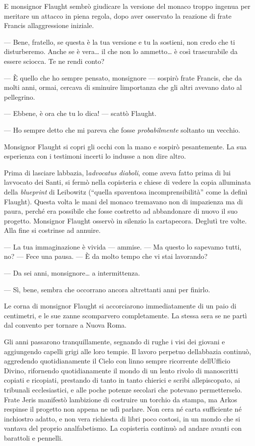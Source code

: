 E monsignor Flaught sembrò giudicare la versione del monaco troppo
ingenua per meritare un attacco in piena regola, dopo aver osservato la
reazione di frate Francis all\textquotesingle aggressione iniziale.

--- Bene, fratello, se questa è la tua versione e tu la sostieni, non
credo che ti disturberemo. Anche se è vera\ldots{} il che non lo
ammetto\ldots{} è così trascurabile da essere sciocca. Te ne rendi
conto?

--- È quello che ho sempre pensato, monsignore --- sospirò frate
Francis, che da molti anni, ormai, cercava di sminuire
l\textquotesingle importanza che gli altri avevano dato al pellegrino.

--- Ebbene, è ora che tu lo dica! --- scattò Flaught.

--- Ho sempre detto che mi pareva che fosse \emph{probabilmente}
soltanto un vecchio.

Monsignor Flaught si copri gli occhi con la mano e sospirò pesantemente.
La sua esperienza con i testimoni incerti lo indusse a non dire altro.

Prima di lasciare l\textquotesingle abbazia,
l\textquotesingle{}\emph{advocatus diaboli}, come aveva fatto prima di
lui l\textquotesingle avvocato dei Santi, si fermò nella copisteria e
chiese di vedere la copia alluminata della \emph{blueprint} di Leibowitz
(``quella spaventosa incomprensibilità'' come la definì Flaught). Questa
volta le mani del monaco tremavano non di impazienza ma di paura, perché
era possibile che fosse costretto ad abbandonare di nuovo il suo
progetto. Monsignor Flaught osservò in silenzio la cartapecora. Deglutì
tre volte. Alla fine si costrinse ad annuire.

--- La tua immaginazione è vivida --- ammise. --- Ma questo lo sapevamo
tutti, no? --- Fece una pausa. --- È da molto tempo che vi stai
lavorando?

--- Da sei anni, monsignore\ldots{} a intermittenza.

--- Sì, bene, sembra che occorrano ancora altrettanti anni per finirlo.

Le corna di monsignor Flaught si accorciarono immediatamente di un paio
di centimetri, e le sue zanne scomparvero completamente. La stessa sera
se ne partì dal convento per tornare a Nuova Roma.

Gli anni passarono tranquillamente, segnando di rughe i visi dei giovani
e aggiungendo capelli grigi alle loro tempie. Il lavoro perpetuo
dell\textquotesingle abbazia continuò, aggredendo quotidianamente il
Cielo con l\textquotesingle inno sempre ricorrente
dell\textquotesingle Ufficio Divino, rifornendo quotidianamente il mondo
di un lento rivolo di manoscritti copiati e ricopiati, prestando di
tanto in tanto chierici e scribi all\textquotesingle episcopato, ai
tribunali ecclesiastici, e alle poche potenze secolari che potevano
permetterselo. Frate Jeris manifestò l\textquotesingle ambizione di
costruire un torchio da stampa, ma Arkos respinse il progetto non appena
ne udì parlare. Non c\textquotesingle era né carta sufficiente né
inchiostro adatto, e non v\textquotesingle era richiesta di libri poco
costosi, in un mondo che si vantava del proprio analfabetismo. La
copisteria continuò ad andare avanti con barattoli e pennelli.

